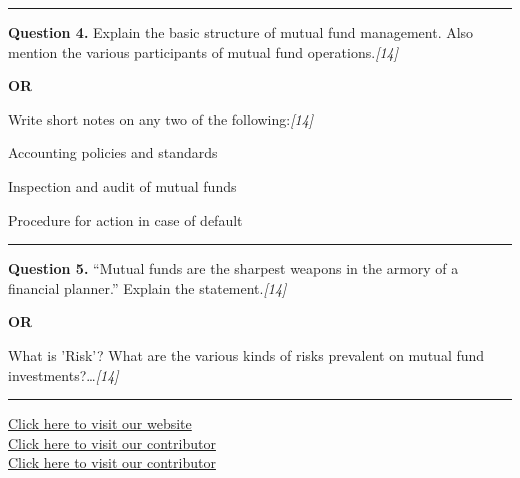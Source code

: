 \documentclass[11pt,a4paper]{article}
\newcommand{\pts}[1]{\hfill   \textit{[#1]}}
\begin{document}
\medskip\rule{\linewidth}{0.2pt}




\noindent   \textbf{Question 4.}
Explain the basic structure of mutual fund management. Also mention the various participants of mutual fund operations.\pts{14}

\centerline{   \textbf{OR}}

Write short notes on any two of the following:\pts{14}

\begin{parts}
  \item Accounting policies and standards
  \item Inspection and audit of mutual funds
  \item Procedure for action in case of default
\end{parts}

\medskip\rule{\linewidth}{0.2pt}




\noindent   \textbf{Question 5.}
``Mutual funds are the sharpest weapons in the armory of a financial planner.'' Explain the statement.\pts{14}

\centerline{   \textbf{OR}}

What is 'Risk'? What are the various kinds of risks prevalent on mutual fund investments?\dots\pts{14}

\vfill
\rule{\linewidth}{0.4pt}

\begin{center}\small
\href{https://bhu-exam.vercel.app/}{Click here to visit our website}\\[4pt]
\href{https://me-aryan.vercel.app/}{Click here to visit our contributor}\\[4pt]
\href{https://quashan-me.vercel.app/}{Click here to visit our contributor}
\end{center}
\end{document}
